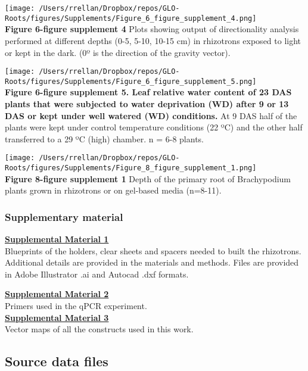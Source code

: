 \documentclass[]{article}
\begin{document}
\texttt{[image: /Users/rrellan/Dropbox/repos/GLO-Roots/figures/Supplements/Figure\_6\_figure\_supplement\_4.png]}\\\textbf{Figure
6-figure supplement 4} Plots showing output of directionality analysis
performed at different depths (0-5, 5-10, 10-15 cm) in rhizotrons
exposed to light or kept in the dark. (0º is the direction of the
gravity vector).\\\pagebreak

\texttt{[image: /Users/rrellan/Dropbox/repos/GLO-Roots/figures/Supplements/Figure\_6\_figure\_supplement\_5.png]}\\\textbf{Figure
6-figure supplement 5. Leaf relative water content of 23 DAS plants that
were subjected to water deprivation (WD) after 9 or 13 DAS or kept under
well watered (WD) conditions.} At 9 DAS half of the plants were kept
under control temperature conditions (22 ºC) and the other half
transferred to a 29 ºC (high) chamber. n = 6-8 plants.\\\pagebreak

\texttt{[image: /Users/rrellan/Dropbox/repos/GLO-Roots/figures/Supplements/Figure\_8\_figure\_supplement\_1.png]}\\\textbf{Figure
8-figure supplement 1} Depth of the primary root of Brachypodium plants
grown in rhizotrons or on gel-based media (n=8-11).\\\pagebreak

\subsubsection{Supplementary material}\label{supplementary-material-1}

\textbf{\href{https://www.dropbox.com/s/f01cg10hqehpnv6/supplement_1.zip?dl=0}{Supplemental
Material 1}}\\Blueprints of the holders, clear sheets and spacers needed
to built the rhizotrons. Additional details are provided in the
materials and methods. Files are provided in Adobe Illustrator .ai and
Autocad .dxf formats.

\textbf{\href{https://www.dropbox.com/s/hn1hhuttdby7y0j/supplement_2.csv?dl=0}{Supplemental
Material 2}}\\Primers used in the qPCR
experiment.\\\textbf{\href{https://www.dropbox.com/s/kg0r5df4nx3tjpy/supplement_3.zip?dl=0}{Supplemental
Material 3}}\\Vector maps of all the constructs used in this work.

\subsection{Source data files}\label{source-data-files}
\end{document}
